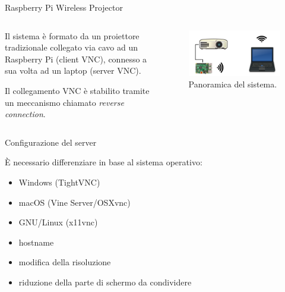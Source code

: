 \documentclass{beamer}
\begin{document}
\begin{frame}[fragile]{Raspberry Pi Wireless Projector}

\begin{columns}[T]
    \begin{column}{.37\textwidth}
    Il sistema è formato da un proiettore tradizionale collegato via cavo ad un Raspberry Pi (client VNC), connesso a sua volta ad un laptop (server VNC).


    \vspace{1em}
    Il collegamento VNC è stabilito tramite un meccanismo chiamato \emph{reverse connection}.

    \end{column}
    \begin{column}{.61\textwidth}
    \begin{figure}
        \includegraphics[scale=1.9]{../img/setup.png}
        \caption{Panoramica del sistema.}
    \end{figure}
    \end{column}
\end{columns}
\end{frame}

\begin{frame}[fragile]{Configurazione del server}

È necessario differenziare in base al sistema operativo:\newline
\begin{itemize}
    \item Windows (TightVNC)
    \item macOS (Vine Server/OSXvnc)
    \item GNU/Linux (x11vnc)

\end{itemize}

\begin{itemize}
    \item hostname
    \item modifica della risoluzione
    \item riduzione della parte di schermo da condividere
\end{itemize}
\end{frame}
\end{document}
